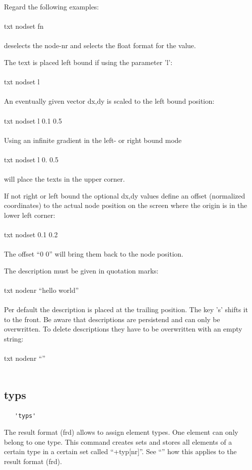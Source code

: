 \documentclass{article}
\begin{document}
Regard the following examples:\\\\txt nodset fn\\\\deselects the node-nr and selects the float format for the value.

The text is placed left bound if using the parameter 'l':\\\\txt nodset l\\\\An eventually given vector dx,dy is scaled to the left bound position:\\\\txt nodset l 0.1 0.5\\\\Using an infinite gradient in the left- or right bound mode\\\\txt nodset l 0. 0.5\\\\will place the texts in the upper corner.

If not right or left bound the optional dx,dy values define an offset (normalized coordinates) to the actual node position on the screen where the origin is in the lower left corner:\\\\txt nodset 0.1 0.2\\\\The offset ``0 0'' will bring them back to the node position.

The description must be given in quotation marks:\\\\txt nodenr ``hello world''\\\\Per default the description is placed at the trailing position. The key 's' shifts it to the front. Be aware that descriptions are persistend and can only be overwritten. To delete descriptions they have to be overwritten with an empty string:\\\\txt nodenr ``''\\\\


\subsection{\label{typs}typs}
\begin{verbatim}
   'typs'
\end{verbatim}
The result format (frd) allows to assign element types. One element can only belong to one type. This command creates sets and stores all elements of a certain type in a certain set called ``+typ[nr]''. See ``'' how this applies to the result format (frd).
\end{document}

